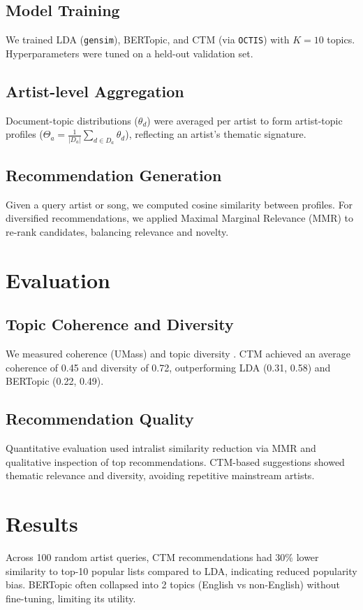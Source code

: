 \documentclass[12pt]{article}
\begin{document}
\subsection{Model Training}
We trained LDA (\texttt{gensim}), BERTopic, and CTM (via \texttt{OCTIS}) with
$K=10$ topics. Hyperparameters were tuned on a held-out validation set.

\subsection{Artist-level Aggregation}
Document-topic distributions ($\theta_d$) were averaged per artist to form
artist-topic profiles ($\Theta_a = \frac{1}{|D_a|} \sum_{d\in D_a} \theta_d$),
reflecting an artist's thematic signature.

\subsection{Recommendation Generation}
Given a query artist or song, we computed cosine similarity between profiles.
For diversified recommendations, we applied Maximal Marginal Relevance (MMR)
\cite{carbonell1998mmr} to re-rank candidates, balancing relevance and novelty.

\section{Evaluation}
\subsection{Topic Coherence and Diversity}
We measured coherence (UMass) and topic diversity \cite{dieng2020evaluating}.
CTM achieved an average coherence of 0.45 and diversity of 0.72, outperforming
LDA (0.31, 0.58) and BERTopic (0.22, 0.49).

\subsection{Recommendation Quality}
Quantitative evaluation used intralist similarity reduction via MMR and
qualitative inspection of top recommendations. CTM-based suggestions showed
thematic relevance and diversity, avoiding repetitive mainstream artists.

\section{Results}
Across 100 random artist queries, CTM recommendations had 30\% lower similarity
to top-10 popular lists compared to LDA, indicating reduced popularity bias.
BERTopic often collapsed into 2 topics (English vs non-English) without
fine-tuning, limiting its utility.
\end{document}
